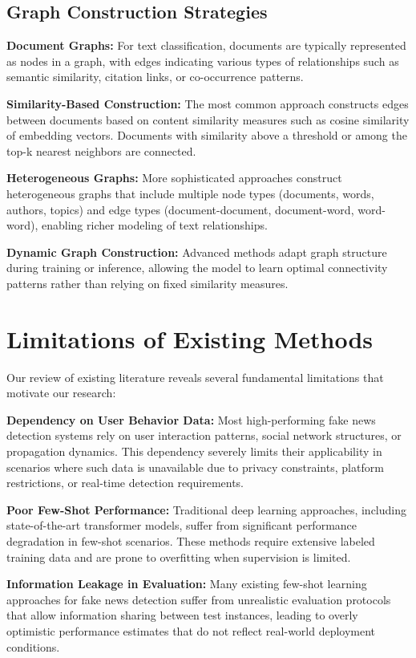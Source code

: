 \subsection{Graph Construction Strategies}

\textbf{Document Graphs:} For text classification, documents are typically represented as nodes in a graph, with edges indicating various types of relationships such as semantic similarity, citation links, or co-occurrence patterns.

\textbf{Similarity-Based Construction:} The most common approach constructs edges between documents based on content similarity measures such as cosine similarity of embedding vectors. Documents with similarity above a threshold or among the top-k nearest neighbors are connected.

\textbf{Heterogeneous Graphs:} More sophisticated approaches construct heterogeneous graphs that include multiple node types (documents, words, authors, topics) and edge types (document-document, document-word, word-word), enabling richer modeling of text relationships.

\textbf{Dynamic Graph Construction:} Advanced methods adapt graph structure during training or inference, allowing the model to learn optimal connectivity patterns rather than relying on fixed similarity measures.

\section{Limitations of Existing Methods}

Our review of existing literature reveals several fundamental limitations that motivate our research:

\textbf{Dependency on User Behavior Data:} Most high-performing fake news detection systems rely on user interaction patterns, social network structures, or propagation dynamics. This dependency severely limits their applicability in scenarios where such data is unavailable due to privacy constraints, platform restrictions, or real-time detection requirements.

\textbf{Poor Few-Shot Performance:} Traditional deep learning approaches, including state-of-the-art transformer models, suffer from significant performance degradation in few-shot scenarios. These methods require extensive labeled training data and are prone to overfitting when supervision is limited.

\textbf{Information Leakage in Evaluation:} Many existing few-shot learning approaches for fake news detection suffer from unrealistic evaluation protocols that allow information sharing between test instances, leading to overly optimistic performance estimates that do not reflect real-world deployment conditions.

